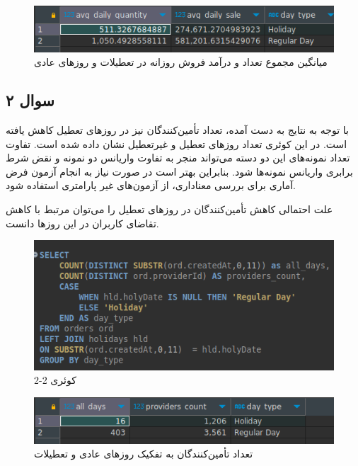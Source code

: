 \documentclass[a4paper,12pt,fullpage]{article}
\begin{document}
\begin{figure}[hbt!]
	\includegraphics[width=\linewidth]{"./images/q2.1_res.png"}
	\caption{میانگین مجموع تعداد و درآمد فروش روزانه در تعطیلات و روز‌های عادی}
	\label{fig_2_1_res}
\end{figure}

\subsection{سوال ۲}
با توجه به نتایج به دست آمده، تعداد تأمین‌کنندگان نیز در روزهای تعطیل کاهش یافته است. در این کوئری تعداد روزهای تعطیل و غیرتعطیل نشان داده شده است. تفاوت تعداد نمونه‌های این دو دسته می‌تواند منجر به تفاوت واریانس دو نمونه و نقض شرط برابری واریانس نمونه‌ها شود. بنابراین بهتر است در صورت نیاز به انجام آزمون فرض آماری برای بررسی معناداری، از آزمون‌های غیر پارامتری استفاده شود. 

علت احتمالی کاهش تأمین‌کنندگان در روزهای تعطیل را می‌توان مرتبط با کاهش تقاضای کاربران در این روز‌ها دانست.
\begin{figure}[hbt!]
	\includegraphics[width=\linewidth]{"./images/q2.2.png"}
	\caption{کوئری 2-2}
	\label{fig2_2}
\end{figure}

\begin{figure}[hbt!]
	\includegraphics[width=\linewidth]{"./images/q2.2_res.png"}
	\caption{تعداد تأمین‌کنندگان به تفکیک روزهای عادی و تعطیلات}
	\label{fig2_2_res}
\end{figure}
\end{document}
